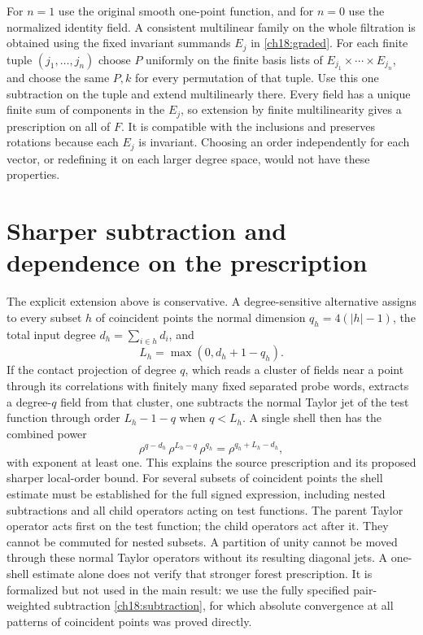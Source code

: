 For $n=1$ use the original smooth one-point function, and for $n=0$
use the normalized identity field. A consistent multilinear family on the whole
filtration is obtained using the fixed invariant summands $E_j$ in
\eqref{ch18:graded}. For each finite tuple $(j_1,\ldots,j_n)$ choose
$P$ uniformly on the finite basis lists of $E_{j_1}\times\cdots\times
E_{j_n}$, and choose the same $P,k$ for every permutation of that tuple.
Use this one subtraction on the tuple and extend multilinearly there.
Every field has a unique finite sum of components in the $E_j$, so
extension by finite multilinearity gives a prescription on all of $F$.
It is compatible with the inclusions and preserves rotations because
each $E_j$ is invariant. Choosing an order independently for each vector,
or redefining it on each larger degree space, would not have these
properties.

\section{Sharper subtraction and dependence on the prescription}
\label{ch18:scope}

The explicit extension above is conservative. A degree-sensitive
alternative assigns to every subset $h$ of coincident points the normal dimension
$q_h=4(|h|-1)$, the total input degree $d_h=\sum_{i\in h}d_i$, and
\[
 L_h=\max(0,d_h+1-q_h).
\]
If the contact projection of degree $q$, which reads a cluster of fields near a point through its correlations with finitely many fixed separated probe words, extracts a degree-$q$ field from that cluster,
one subtracts the normal Taylor jet of the test function through order $L_h-1-q$ when
$q<L_h$. A single shell then has the combined power
\[
 \rho^{q-d_h}\,\rho^{L_h-q}\,\rho^{q_h}
                  =\rho^{q_h+L_h-d_h},
\]
with exponent at least one. This explains the source prescription and
its proposed sharper local-order bound. For several subsets of coincident points the
shell estimate must be established for the full signed expression,
including nested subtractions and all child operators acting on test functions. The parent
Taylor operator acts first on the test function; the child operators act after
it. They cannot be commuted for nested subsets. A partition of unity
cannot be moved through these normal Taylor operators without its
resulting diagonal jets. A one-shell estimate alone does not verify
that stronger forest prescription. It is formalized but not used in the main result: we use the fully
specified pair-weighted subtraction \eqref{ch18:subtraction}, for which
absolute convergence at all patterns of coincident points was proved directly.

